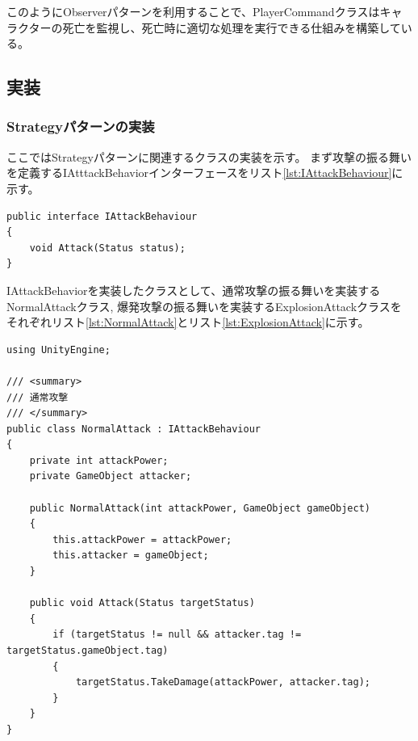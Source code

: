 \documentclass[dvipdfmx,fleqn,article]{jlreq}
\begin{document}
このようにObserverパターンを利用することで、PlayerCommandクラスはキャラクターの死亡を監視し、死亡時に適切な処理を実行できる仕組みを構築している。



\subsection{実装}

\subsubsection{Strategyパターンの実装}
ここではStrategyパターンに関連するクラスの実装を示す。
まず攻撃の振る舞いを定義するIAtttackBehaviorインターフェースをリスト\ref{lst:IAttackBehaviour}に示す。
\begin{lstlisting}[language=CSharp, caption=IAttackBehaviourインターフェース, label={lst:IAttackBehaviour}]
public interface IAttackBehaviour
{
    void Attack(Status status);
}
\end{lstlisting}

IAttackBehaviorを実装したクラスとして、通常攻撃の振る舞いを実装するNormalAttackクラス, 
爆発攻撃の振る舞いを実装するExplosionAttackクラスを
それぞれリスト\ref{lst:NormalAttack}とリスト\ref{lst:ExplosionAttack}に示す。

\begin{lstlisting}[language=CSharp, caption=NormalAttackクラス, label={lst:NormalAttack}]
using UnityEngine;

/// <summary>
/// 通常攻撃
/// </summary>
public class NormalAttack : IAttackBehaviour
{
    private int attackPower;
    private GameObject attacker;

    public NormalAttack(int attackPower, GameObject gameObject)
    {
        this.attackPower = attackPower;
        this.attacker = gameObject;
    }

    public void Attack(Status targetStatus)
    {
        if (targetStatus != null && attacker.tag != targetStatus.gameObject.tag)
        {
            targetStatus.TakeDamage(attackPower, attacker.tag);
        }
    }
}
\end{lstlisting}
\end{document}
